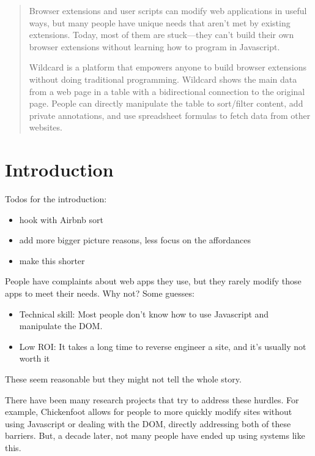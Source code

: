 \documentclass[english,submission]{programming}
\providecommand{\tightlist}{%
  \setlength{\itemsep}{0pt}\setlength{\parskip}{0pt}}
\begin{document}
\begin{abstract}
Browser extensions and user scripts can modify web applications in
useful ways, but many people have unique needs that aren't met by
existing extensions. Today, most of them are stuck---they can't build
their own browser extensions without learning how to program in
Javascript.

Wildcard is a platform that empowers anyone to build browser extensions
without doing traditional programming. Wildcard shows the main data from
a web page in a table with a bidirectional connection to the original
page. People can directly manipulate the table to sort/filter content,
add private annotations, and use spreadsheet formulas to fetch data from
other websites.
\end{abstract}


\hypertarget{introduction}{%
\section{Introduction}\label{introduction}}

Todos for the introduction:

\begin{itemize}
\tightlist
\item
  hook with Airbnb sort
\item
  add more bigger picture reasons, less focus on the affordances
\item
  make this shorter
\end{itemize}

People have complaints about web apps they use, but they rarely modify
those apps to meet their needs. Why not? Some guesses:

\begin{itemize}
\tightlist
\item
  Technical skill: Most people don't know how to use Javascript and
  manipulate the DOM.
\item
  Low ROI: It takes a long time to reverse engineer a site, and it's
  usually not worth it
\end{itemize}

These seem reasonable but they might not tell the whole story.

There have been many research projects that try to address these
hurdles. For example, Chickenfoot \autocite{bolin2005} allows for people
to more quickly modify sites without using Javascript or dealing with
the DOM, directly addressing both of these barriers. But, a decade
later, not many people have ended up using systems like this.
\end{document}
